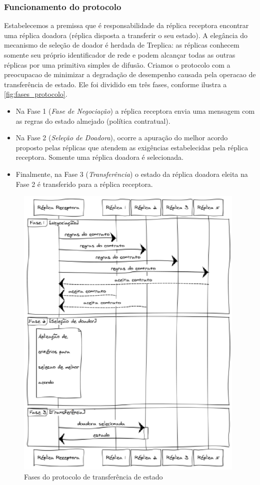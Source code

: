 \subsubsection{Funcionamento do protocolo}

Estabelecemos a premissa que é responsabilidade da réplica receptora encontrar uma réplica
doadora (réplica disposta a transferir o seu estado). A elegância do mecanismo de seleção
de doador é herdada de Treplica: as réplicas conhecem somente seu próprio identificador de
rede e podem alcançar todas as outras réplicas por uma primitiva simples de difusão.
Criamos o protocolo com a preocupacao de minimizar a degradação de desempenho causada pela
operacao de transferência de estado. Ele foi dividido em três fases, conforme ilustra a
\autoref{fig:fases_protocolo}.

\begin{itemize}
  \item Na Fase 1 (\emph{Fase de Negociação}) a réplica receptora envia uma mensagem com
    as regras do estado almejado (política contratual).
  \item Na Fase 2 (\emph{Seleção de Doadora}), ocorre a apuração do melhor acordo proposto
    pelas réplicas que atendem as exigências estabelecidas pela réplica receptora. Somente
    uma réplica doadora é selecionada.
  \item Finalmente, na Fase 3 (\emph{Transferência}) o estado da réplica doadora eleita na
    Fase 2 é transferido para a réplica receptora.
\end{itemize}

\begin{figure}[ht]
  \centering
  \includegraphics[width=11cm]{conteudo/capitulos/figuras/fases_protocolo.eps}
  \caption{Fases do protocolo de transferência de estado}
  \label{fig:fases_protocolo}
\end{figure}

